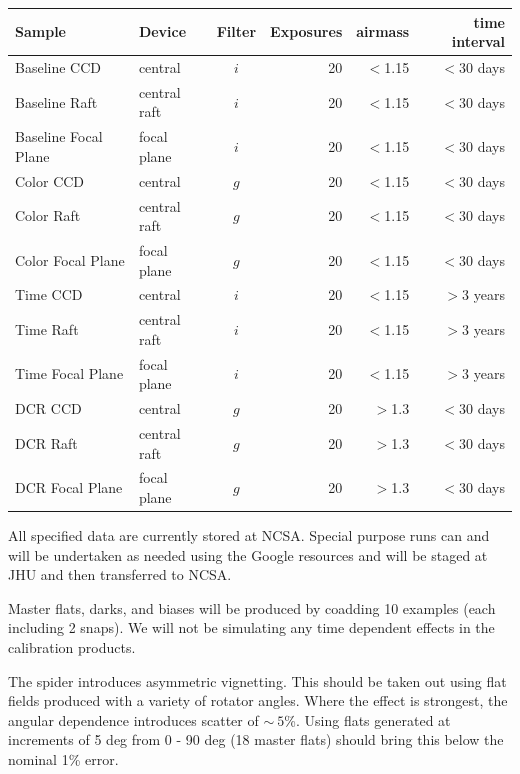 \documentclass[prd, nofootinbib, floatfix, 11pt,tightenlines,times]{article}
\begin{document}
\begin{table}
\begin{center}
\begin{tabular}{llcrrr}
Sample & Device & Filter & Exposures & airmass & time interval \\
\hline  
Baseline CCD             & central         & $i$  & 20 & $<$1.15 &$<$30 days \\
Baseline Raft              & central raft  & $i$  & 20 & $<$1.15 &$<$30 days \\
Baseline Focal Plane   & focal plane  &  $i$ & 20 & $<$1.15 &$<$30
days \\
\hline  
Color CCD             & central         & $g$  & 20 & $<$1.15 &$<$30 days \\
Color Raft              & central raft  & $g$  & 20 & $<$1.15 &$<$30 days \\
Color Focal Plane   & focal plane  &  $g$ & 20 & $<$1.15 &$<$30 days \\
\hline 
Time CCD             & central         & $i$  & 20 & $<$1.15 &$>$3 years \\
Time Raft              & central raft  & $i$  & 20 & $<$1.15 &$>$3 years \\
Time Focal Plane   & focal plane  &  $i$ & 20 & $<$1.15 &$>$3 years \\
\hline 
DCR CCD             & central         & $g$  & 20 & $>$1.3 &$<$30 days \\
DCR Raft              & central raft  & $g$  & 20 & $>$1.3 &$<$30 days \\
DCR Focal Plane   & focal plane  & $g$  & 20 & $>$1.3 &$<$30 days
\end{tabular}
\end{center}
\end{table}


All specified data are currently stored at NCSA.  Special purpose runs
can and will be undertaken as needed using the Google resources and
will be staged at JHU and then transferred to NCSA.  

Master flats, darks, and biases will be produced by coadding 10
examples (each including 2 snaps).  We will not be simulating any time
dependent effects in the calibration products.

The spider introduces asymmetric vignetting.  This should be taken out
using flat fields produced with a variety of rotator angles.  Where
the effect is strongest, the angular dependence introduces scatter of
$\sim~5$\%.  Using flats generated at increments of 5 deg from 0 - 90
deg (18 master flats) should bring this below the nominal 1\% error.  
\end{document}
